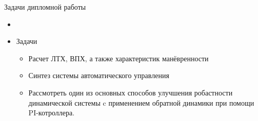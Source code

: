 \begin{frame}{Задачи дипломной работы}
\begin{itemize}
    \item <+-> []
    \item <+-> [] \begin{block}{Задачи}
        \begin{itemize}
        \item Расчет ЛТХ, ВПХ, а также характеристик манёвренности
        \item Синтез системы автоматического управления
        \item Рассмотреть один из основных способов улучшения робастности динамической 
        системы c применением обратной динамики при помощи PI-котроллера.
        \end{itemize}
    \end{block}
\end{itemize}    
\end{frame}